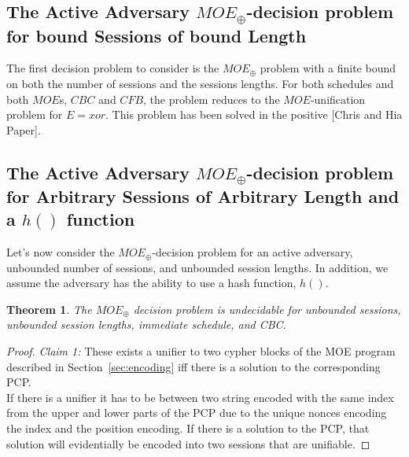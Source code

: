 \documentclass[11pt,twoside,a4paper]{article}
\newtheorem{theorem}{Theorem}
\begin{document}
\subsection{The Active Adversary $MOE_{\oplus}$-decision problem for bound Sessions of bound Length}
The first decision problem to consider is the $MOE_{\oplus}$
problem with a finite bound on both the number of sessions and
the sessions lengths. 
For both schedules and both $MOE$s, $CBC$ and $CFB$, the problem
reduces to the $MOE$-unification problem for $E=xor$. This problem
has been solved in the positive [Chris and Hia Paper].

\subsection{The Active Adversary $MOE_{\oplus}$-decision problem for Arbitrary Sessions of Arbitrary Length and a $h()$ function}
Let's now consider the $MOE_{\oplus}$-decision problem
for an active adversary, unbounded number of sessions, and unbounded session lengths. In addition, we assume the adversary has the ability 
to use a hash function, $h()$.
 
\begin{theorem}\label{thm:unbounded_unbounded}
The $MOE_{\oplus}$ decision problem is undecidable for unbounded 
sessions, unbounded session lengths, immediate schedule, and CBC. 
\end{theorem}
\begin{proof}
	\textit{Claim 1:} These exists a unifier to two cypher blocks
	of the MOE program described in Section~\ref{sec:encoding} iff
	there is a solution to the corresponding PCP.
	\noindent
	\\
	If there is a unifier it has to be between two string encoded 
	with the same index from the upper and lower parts of the PCP
	due to the unique nonces encoding the index and the position encoding.
	If there is a solution to the PCP, that solution will evidentially
	be encoded into two sessions that are unifiable. 
\end{proof}
\end{document}
